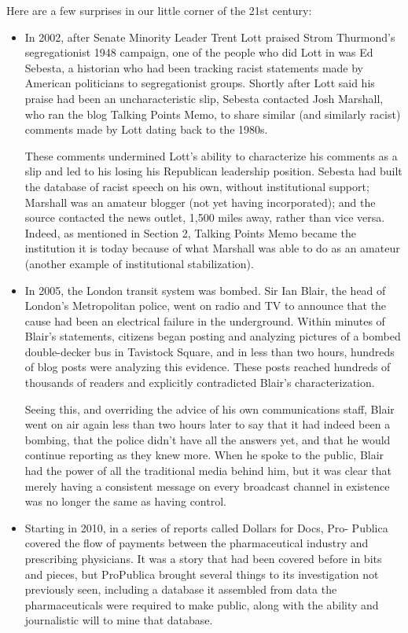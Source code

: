 Here are a few surprises in our little corner of the 21st century:
\begin{itemize}
\item In 2002, after Senate Minority Leader Trent Lott praised Strom
Thurmond’s segregationist 1948 campaign, one of the people who
did Lott in was Ed Sebesta, a historian who had been tracking racist
statements made by American politicians to segregationist groups.
Shortly after Lott said his praise had been an uncharacteristic slip,
Sebesta contacted Josh Marshall, who ran the blog Talking Points
Memo, to share similar (and similarly racist) comments made by Lott
dating back to the 1980s.

These comments undermined Lott’s ability to characterize his comments
as a slip and led to his losing his Republican leadership position.
Sebesta had built the database of racist speech on his own,
without institutional support; Marshall was an amateur blogger (not
yet having incorporated); and the source contacted the news outlet,
1,500 miles away, rather than vice versa. Indeed, as mentioned in Section
2, Talking Points Memo became the institution it is today because
of what Marshall was able to do as an amateur (another example
of institutional stabilization).

\item In 2005, the London transit system was bombed. Sir Ian Blair, the
head of London’s Metropolitan police, went on radio and TV to
announce that the cause had been an electrical failure in the underground.
Within minutes of Blair’s statements, citizens began posting
and analyzing pictures of a bombed double-decker bus in Tavistock
Square, and in less than two hours, hundreds of blog posts were analyzing
this evidence. These posts reached hundreds of thousands of
readers and explicitly contradicted Blair’s characterization.

Seeing this, and overriding the advice of his own communications
staff, Blair went on air again less than two hours later to say that it had
indeed been a bombing, that the police didn’t have all the answers yet,
and that he would continue reporting as they knew more. When he
spoke to the public, Blair had the power of all the traditional media
behind him, but it was clear that merely having a consistent message
on every broadcast channel in existence was no longer the same as
having control.

\item Starting in 2010, in a series of reports called Dollars for Docs, Pro-
Publica covered the flow of payments between the pharmaceutical
industry and prescribing physicians. It was a story that had been
covered before in bits and pieces, but ProPublica brought several
things to its investigation not previously seen, including a database it
assembled from data the pharmaceuticals were required to make public,
along with the ability and journalistic will to mine that database.


\end{itemize}
